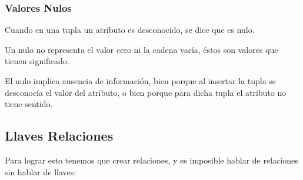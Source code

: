 \documentclass[12pt, fleqn]{report}                             %
\theoremstyle{break}                                            %
\begin{document}
            \subsubsection{Valores Nulos}

                Cuando en una tupla un atributo es desconocido, se dice que es nulo.
                    
                Un nulo no representa el valor cero ni la cadena vacía, éstos son valores que
                tienen significado.

                El nulo implica ausencia de información, bien porque al insertar la tupla se 
                desconocía el valor del atributo, o bien porque para dicha tupla el atributo no
                tiene sentido.

            \clearpage
            \subsection{Llaves Relaciones}

                Para lograr esto tenemos que crear relaciones, y es imposible hablar de
                relaciones sin hablar de llaves:
\end{document}
